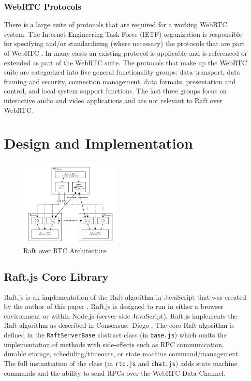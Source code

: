 \documentclass[conference,compsoc]{./IEEEtran/IEEEtran}
\begin{document}
\subsubsection{WebRTC Protocols}

There is a large suite of protocols that are required for a working WebRTC system. The Internet Engineering Task Force (IETF) organization is responsible for specifying and/or standardizing (where necessary) the protocols that are part of WebRTC \cite{draft-rtcweb-overview} \cite{draft-rtcweb-security-arch} \cite{draft-rtcweb-security}. In many cases an existing protocol is applicable and is referenced or extended as part of the WebRTC suite. The protocols that make up the WebRTC suite are categorized into five general functionality groups: data transport, data framing and security, connection management, data formats, presentation and control, and local system support functions. The last three groups focus on interactive audio and video applications and are not relevant to Raft over WebRTC.

\section{Design and Implementation}

\begin{figure}[!t]
  \centerline{\includegraphics[width=0.45\textwidth]{imgs/raft_rtc_architecture}}
  \caption{Raft over RTC Architecture}
    \label{fig:raft_rtc_architecture}
\end{figure}

\subsection{Raft.js Core Library}

Raft.js is an implementation of the Raft algorithm in JavaScript that was created by the author of this paper \cite{raft.js}.  Raft.js is designed to run in either a browser environment or within Node.js (server-side JavaScript). Raft.js implements the Raft algorithm as described in Consensus:~Diego \cite{raft_thesis:ongaro14}. The core Raft algorithm is defined in the \texttt{RaftServerBase} abstract class (in \texttt{base.js}) which omits the implementation of methods with side-effects such as RPC communication, durable storage, scheduling/timeouts, or state machine command/management. The full instantiation of the class (in \texttt{rtc.js} and \texttt{chat.js}) adds state machine commands and the ability to send RPCs over the WebRTC Data Channel.
\end{document}
